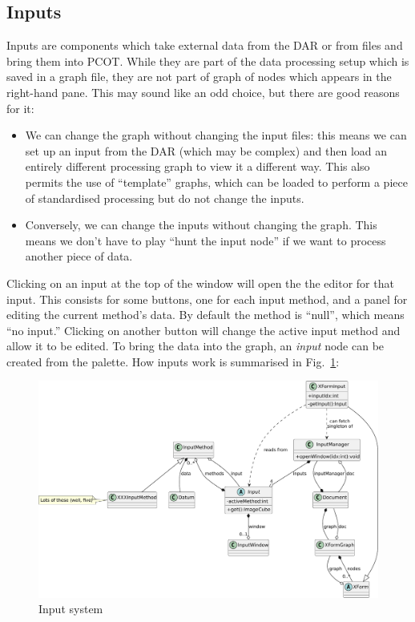 \subsection{Inputs}
\label{inputs}
Inputs are components which take external data from the DAR or from files and
bring them into PCOT. While they are part of the
data processing setup which is saved in a graph file, they are not
part of graph of nodes which appears in the right-hand pane. This may sound
like an odd choice, but there are good reasons for it:
\begin{itemize}
\item We can change the graph without changing the input files: this
means we can set up an input from the DAR (which may be complex) and
then load an entirely different processing graph to view it a different way.
This also permits the use of ``template'' graphs, which can be loaded
to perform a piece of standardised processing but do not change the inputs.
\item Conversely, we can change the inputs without changing the graph.
This means we don't have to play ``hunt the input node'' if we want
to process another piece of data.
\end{itemize}
Clicking on an input at the top of the window will open the the editor for
that input. This consists for some buttons, one for each input method, and a
panel for editing the current method's data. By default the method is
``null'', which means ``no input.'' Clicking on another button will change the
active input method and allow it to be edited.
To bring the data into the graph, an \emph{input} node can be created from
the palette.
How inputs work is summarised in Fig.~\ref{inputs.pdf}:
\begin{figure}[ht]
\center
\includegraphics[width=5in]{inputs.pdf}
\caption{Input system}
\label{inputs.pdf}
\end{figure}
